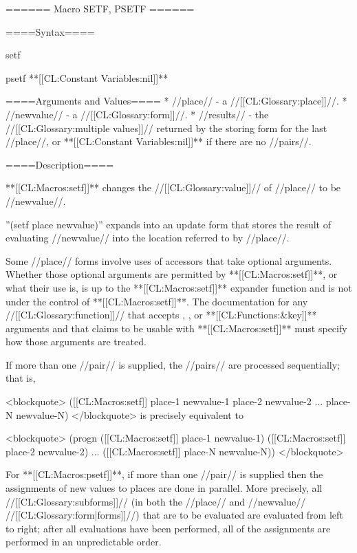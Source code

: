 ====== Macro SETF, PSETF ======

====Syntax====

\DefmacWithValues setf {} {}

\DefmacWithValues psetf {} {**[[CL:Constant Variables:nil]]**}


====Arguments and Values====
  * //place// - a //[[CL:Glossary:place]]//.
  * //newvalue// - a //[[CL:Glossary:form]]//.
  * //results// - the //[[CL:Glossary:multiple values]]// returned by the storing form for the last //place//, or **[[CL:Constant Variables:nil]]** if there are no //pairs//.

====Description====

**[[CL:Macros:setf]]** changes the //[[CL:Glossary:value]]// of //place// to be //newvalue//.

''(setf place newvalue)'' expands into an update form that stores the result of evaluating //newvalue// into the location referred to by //place//.

Some //place// forms involve uses of accessors that take optional arguments. Whether those optional arguments are permitted by **[[CL:Macros:setf]]**, or what their use is, is up to the **[[CL:Macros:setf]]** expander function and is not under the control of **[[CL:Macros:setf]]**. The documentation for any //[[CL:Glossary:function]]// that accepts , , or **[[CL:Functions:&key]]** arguments and that claims to be usable with **[[CL:Macros:setf]]** must specify how those arguments are treated.



If more than one //pair// is supplied, the //pairs// are processed sequentially; that is,

<blockquote> ([[CL:Macros:setf]] place-1 newvalue-1 place-2 newvalue-2 ... place-N newvalue-N) </blockquote> is precisely equivalent to

<blockquote> (progn ([[CL:Macros:setf]] place-1 newvalue-1) ([[CL:Macros:setf]] place-2 newvalue-2) ... ([[CL:Macros:setf]] place-N newvalue-N)) </blockquote>

For **[[CL:Macros:psetf]]**, if more than one //pair// is supplied then the assignments of new values to places are done in parallel. More precisely, all //[[CL:Glossary:subforms]]// (in both the //place// and //newvalue// //[[CL:Glossary:form|forms]]//) that are to be evaluated are evaluated from left to right; after all evaluations have been performed, all of the assignments are performed in an unpredictable order.

